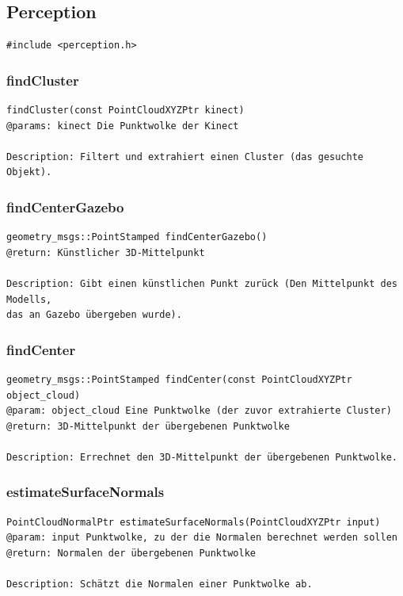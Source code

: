 \documentclass{suturo}
\begin{document}
\subsection{Perception}

\begin{verbatim}
#include <perception.h>
\end{verbatim}


\subsubsection{findCluster}
\begin{verbatim}
findCluster(const PointCloudXYZPtr kinect)
@params: kinect Die Punktwolke der Kinect

Description: Filtert und extrahiert einen Cluster (das gesuchte Objekt).
\end{verbatim}\label{func:findcluster}

\subsubsection{findCenterGazebo}
\begin{verbatim}
geometry_msgs::PointStamped findCenterGazebo()
@return: Künstlicher 3D-Mittelpunkt

Description: Gibt einen künstlichen Punkt zurück (Den Mittelpunkt des Modells, 
das an Gazebo übergeben wurde).
\end{verbatim}\label{func:findcentergazebo}


\subsubsection{findCenter}
\begin{verbatim}
geometry_msgs::PointStamped findCenter(const PointCloudXYZPtr object_cloud)
@param: object_cloud Eine Punktwolke (der zuvor extrahierte Cluster)
@return: 3D-Mittelpunkt der übergebenen Punktwolke

Description: Errechnet den 3D-Mittelpunkt der übergebenen Punktwolke.
\end{verbatim}\label{func:findcenter}

\subsubsection{estimateSurfaceNormals}
\begin{verbatim}
PointCloudNormalPtr estimateSurfaceNormals(PointCloudXYZPtr input)
@param: input Punktwolke, zu der die Normalen berechnet werden sollen
@return: Normalen der übergebenen Punktwolke

Description: Schätzt die Normalen einer Punktwolke ab.
\end{verbatim}\label{func:estimatesurfacenormals}
\end{document}
